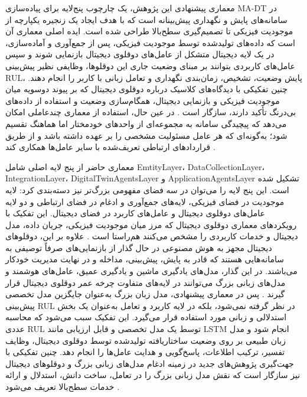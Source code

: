 \documentclass[a4paper,fleqn]{report}
\begin{document}
معماری پیشنهادی این پژوهش، یک چارچوب پنج‌لایه برای پیاده‌سازی \gls{MA-DT} در سامانه‌های پایش و نگهداری پیش‌بینانه است که با هدف ایجاد یک زنجیره یکپارچه از موجودیت فیزیکی تا تصمیم‌گیری سطح‌بالا طراحی شده است. ایده اصلی معماری آن است که داده‌های تولیدشده توسط موجودیت فیزیکی، پس از جمع‌آوری و آماده‌سازی، در یک لایه دیجیتال متشکل از عامل‌های دوقلوی دیجیتال بازنمایی شوند و سپس عامل‌های کاربردی بتوانند بر مبنای وضعیت جاری این دوقلوها، وظایفی نظیر پیش‌بینی \gls{RUL}، پایش وضعیت، تشخیص، زمان‌بندی نگهداری و تعامل زبانی با کاربر را انجام دهند. چنین تفکیکی با دیدگاه‌های کلاسیک درباره دوقلوی دیجیتال که بر پیوند دوسویه میان موجودیت فیزیکی و بازنمایی دیجیتال، همگام‌سازی وضعیت و استفاده از داده‌های بی‌درنگ تأکید دارند، سازگار است \cite{tao2019digital,barricelli2019survey,fuller2020digital,qi2021enabling}. در عین حال، استفاده از معماری چندعاملی امکان می‌دهد که پیچیدگی سامانه به مجموعه‌ای از واحدهای خودمختار اما هماهنگ تقسیم شود؛ به‌گونه‌ای که هر عامل مسئولیت مشخصی را بر عهده داشته باشد و از طریق قراردادهای ارتباطی تعریف‌شده با سایر عامل‌ها همکاری کند \cite{dorri2018multiagent,pretel2022masdt,lopez2024madtwin,wang2024multiagent}.

معماری حاضر از پنج لایه اصلی شامل \gls{EmtityLayer}، \gls{DataCollectionLayer}، \gls{IntegrationLayer}، \gls{DigitalTwinAgentsLayer} و \gls{ApplicationAgentsLayer} تشکیل شده است. این پنج لایه را می‌توان در سه فضای مفهومی بزرگ‌تر نیز دسته‌بندی کرد: لایه موجودیت در فضای فیزیکی، لایه‌های جمع‌آوری و ادغام در فضای ارتباطی و دو لایه عامل‌های دوقلوی دیجیتال و عامل‌های کاربرد در فضای دیجیتال. این تفکیک با رویکردهای معماری دوقلوی دیجیتال که مرز میان موجودیت فیزیکی، جریان داده، مدل دیجیتال و خدمات کاربردی را مشخص می‌کنند هم‌راستا است \cite{tao2019digital,qi2021enabling}. علاوه بر این، دوقلوهای دیجیتال مجهز به هوش مصنوعی در حال گذار از بازنمایی‌های صرفاً توصیفی به سامانه‌هایی هستند که قادر به پایش، پیش‌بینی، مداخله و در نهایت مدیریت خودکار می‌باشند. در این گذار، مدل‌های یادگیری ماشین و یادگیری عمیق، عامل‌های هوشمند و مدل‌های زبانی بزرگ می‌توانند در لایه‌های متفاوت چرخه عمر دوقلوی دیجیتال قرار گیرند \cite{zhou2026dtai,fu2026genaidt}. پس در معماری پیشنهادی، مدل زبان بزرگ به‌عنوان جایگزین مدل تخصصی پیش‌بینی \gls{RUL} در نظر گرفته نمی‌شود، بلکه در لایه کاربرد و تعامل به‌عنوان یک بخش استدلالی و زبانی مورد استفاده قرار می‌گیرد. این تفکیک سبب می‌شود که محاسبه عددی \gls{RUL} توسط یک مدل تخصصی و قابل ارزیابی مانند LSTM انجام شود و مدل زبان طبیعی بر روی وضعیت ساختاریافته تولیدشده توسط دوقلوی دیجیتال، وظایف تفسیر، ترکیب اطلاعات، پاسخ‌گویی و هدایت عامل‌ها را انجام دهد. چنین تفکیکی با جهت‌گیری پژوهش‌های جدید در زمینه ادغام مدل‌های زبانی بزرگ و دوقلو‌های دیجیتال نیز سازگار است که نقش مدل زبانی بزرگ را در تعامل، ساخت دانش، استدلال و ارائه خدمات سطح‌بالا تعریف می‌شود \cite{CHEN2025102982LLMDT,zhou2026dtai,maghanaki2026llmmanufacturing}.
\end{document}
